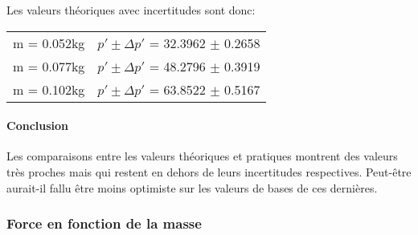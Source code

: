 Les valeurs théoriques avec incertitudes sont donc:

\begin{table}[ht]
    \centering
    \begin{tabular}{l l}
	m = 0.052kg & $p' \pm \Delta p'$ = 32.3962 $\pm$ 0.2658 \\
	m = 0.077kg & $p' \pm \Delta p'$ = 48.2796 $\pm$ 0.3919 \\
	m = 0.102kg & $p' \pm \Delta p'$ = 63.8522 $\pm$ 0.5167 \\
    \end{tabular}
\end{table}

\paragraph{Conclusion}

Les comparaisons entre les valeurs théoriques et pratiques montrent des valeurs très proches mais qui restent en dehors de leurs incertitudes respectives. Peut-être aurait-il fallu être moins optimiste sur les valeurs de bases de ces dernières.

\newpage
\subsubsection{Force en fonction de la masse}

